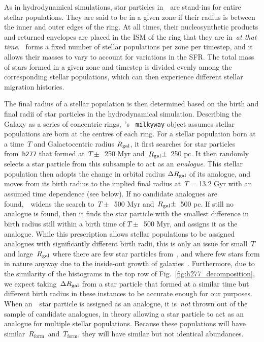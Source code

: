 \documentclass[draft2.tex]{subfiles}
\begin{document}
\par 
As in hydrodynamical simulations, star particles in~\vice~are stand-ins for 
entire stellar populations. 
They are said to be in a given zone if their radius is between the inner and 
outer edges of the ring. 
At all times, their nucleosynthetic products and returned envelopes are placed 
in the ISM of the ring that they are in~\textit{at that time}. 
\vice~forms a fixed number of stellar populations per zone per timestep, and it 
allows their masses to vary to account for variations in the SFR. 
The total mass of stars formed in a given zone and timestep is divided evenly 
among the corresponding stellar populations, which can then experience 
different stellar migration histories. 
\par 
The final radius of a stellar population is then determined based on the birth 
and final radii of star particles in the hydrodynamical simulation. 
Describing the Galaxy as a series of concentric rings,~\vice's~
\texttt{milkyway} object assumes stellar populations are born at the centres of 
each ring. 
For a stellar population born at a time~$T$ and Galactocentric radius 
$R_\text{gal}$, it first searches for star particles from~\texttt{h277} that 
formed at~$T \pm$~250 Myr and~$R_\text{gal} \pm$~250 pc. 
It then randomly selects a star particle from this subsample to act as an 
\textit{analogue}. 
This stellar population then adopts the change in orbital radius 
$\Delta R_\text{gal}$ of its analogue, and moves from its birth radius to the 
implied final radius at~$T$ = 13.2 Gyr with an assumed time dependence (see 
below). 
If no candidate analogues are found,~\vice~widens the search to~$T \pm$~500 Myr 
and~$R_\text{gal} \pm$~500 pc. 
If still no analogue is found, then it finds the star particle with the 
smallest difference in birth radius still within a birth time of $T \pm$~500 
Myr, and assigns it as the analogue. 
While this prescription allows stellar populations to be assigned analogues 
with significantly different birth radii, this is only an issue for small~$T$ 
and large~$R_\text{gal}$ where there are few star particles from~\hsim, 
and where few stars form in nature anyway due to the inside-out growth of 
galaxies~\citep[e.g.][]{Bird2013}. 
Furthermore, due to the similarity of the histograms in the top row of 
Fig.~\ref{fig:h277_decomposition}, we expect taking~$\Delta R_\text{gal}$ from 
a star particle that formed at a similar time but different birth radius in 
these instances to be accurate enough for our purposes. 
When an~\hsim~star particle is assigned as an analogue, it is~\textit{not} 
thrown out of the sample of candidate analogues, in theory allowing a star 
particle to act as an analogue for multiple stellar populations. Because these 
populations will have similar~$R_\text{form}$~and~$T_\text{form}$, they will 
have similar but not identical abundances. 
\end{document}
